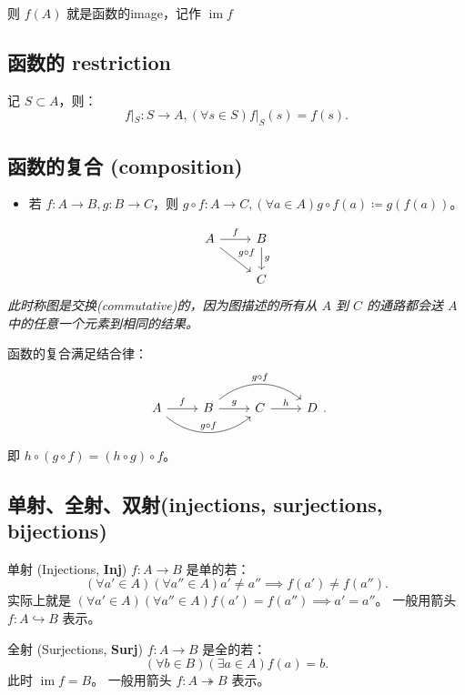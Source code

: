 则 \(f(A)\) 就是函数的image，记作 \(\operatorname{im}f\)

\subsection{函数的 restriction}

记 \(S\subset A\)，则：
\[
    f|_S : S \to A, (\forall s\in S) f|_S(s) = f(s)
    .\]

\subsection{函数的复合 (composition)}

\begin{itemize}
    \item 若 \(f:A\to B, g: B\to C\)，则 \(g\circ f: A\to C, (\forall a\in A) g\circ f(a) \coloneqq g\left( f(a) \right) \)。
\end{itemize}
\[
    \begin{tikzcd}
        A \arrow[rd, "g \circ f"]\arrow[r, "f"] & B\arrow[d, "g"] \\
        {}                                      & C
    \end{tikzcd}
\]
{\slshape 此时称图是交换(commutative)的，因为图描述的所有从 \(A\) 到 \(C\) 的通路都会送 \(A\) 中的任意一个元素到相同的结果。 }

函数的复合满足结合律：
\[
    \begin{tikzcd}
        A\arrow[r, "f"]\arrow[rr, "g\circ f", bend left = -40] & B\arrow[r, "g"]\arrow[rr, "g\circ f", bend left = 40] & C\arrow[r, "h"] & D
    \end{tikzcd}
    .\]
即 \(h \circ (g \circ f) = (h\circ g) \circ f\)。

\subsection{单射、全射、双射(injections, surjections, bijections)}


\begin{defi}{单射 (Injections, \textbf{Inj})}
    \(f: A\to B\) 是单的若：
    \[
        (\forall a'\in A)(\forall a''\in A) a' \neq a'' \implies f\left( a' \right) \neq f(a'')
        .\]
    实际上就是 \((\forall a'\in A)(\forall a''\in A) f\left( a' \right) = f\left( a'' \right) \implies a'=a''\)。
    一般用箭头 \(f: A ↪ B \) 表示。
\end{defi}

\begin{defi}{全射 (Surjections, \textbf{Surj})}
    \(f : A\to B\) 是全的若：
    \[
        (\forall b\in B)(\exists a\in A) f(a) = b
        .\]
    此时 \(\operatorname{im}f = B\)。
    一般用箭头 \(f: A ↠ B\) 表示。
\end{defi}

